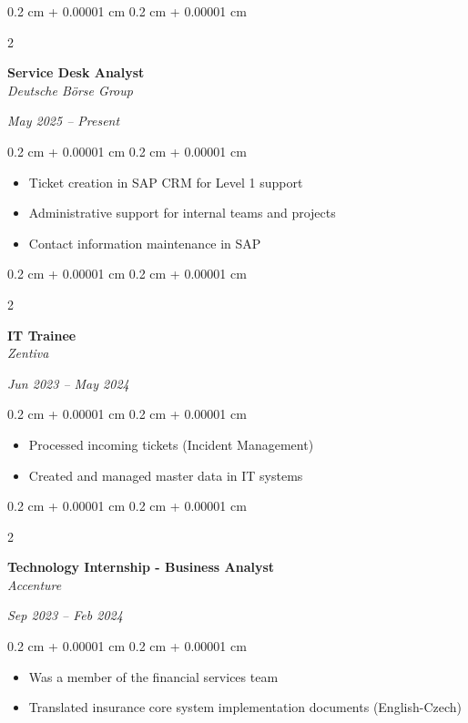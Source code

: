 \documentclass[10pt, letterpaper]{extarticle}
\newenvironment{highlights}{
    \begin{itemize}[
        topsep=0.10 cm,
        parsep=0.10 cm,
        partopsep=0pt,
        itemsep=0pt,
        leftmargin=0.4 cm + 10pt
    ]
}{
    \end{itemize}
} %
\newenvironment{onecolentry}{
    \begin{adjustwidth}{
        0.2 cm + 0.00001 cm
    }{
        0.2 cm + 0.00001 cm
    }
}{
    \end{adjustwidth}
} %
\newenvironment{twocolentry}[2][]{
    \onecolentry
    \def\secondColumn{#2}
    \setcolumnwidth{\fill, 4.5 cm}
    \begin{paracol}{2}
}{
    \switchcolumn \raggedleft \secondColumn
    \end{paracol}
    \endonecolentry
} %
\begin{document}
        \vspace{0.2 cm}
        \begin{twocolentry}{\textit{May 2025 – Present}}
            \textbf{Service Desk Analyst} \\
            \textit{Deutsche Börse Group}
        \end{twocolentry}
        
        \vspace{0.10 cm}
        \begin{onecolentry}
            \begin{highlights}
                \item Ticket creation in SAP CRM for Level 1 support 
                \item Administrative support for internal teams and projects
                \item Contact information maintenance in SAP
            \end{highlights}
        \end{onecolentry}
        
        \vspace{0.2 cm}
        \begin{twocolentry}{\textit{Jun 2023 – May 2024}}
            \textbf{IT Trainee} \\
            \textit{Zentiva}
        \end{twocolentry}
        
        \vspace{0.10 cm}
        \begin{onecolentry}
            \begin{highlights}
                \item Processed incoming tickets (Incident Management)
                \item Created and managed master data in IT systems
            \end{highlights}
        \end{onecolentry}
        
        \vspace{0.2 cm}
        \begin{twocolentry}{\textit{Sep 2023 – Feb 2024}}
            \textbf{Technology Internship - Business Analyst} \\
            \textit{Accenture}
        \end{twocolentry}
        
        \vspace{0.10 cm}
        \begin{onecolentry}
            \begin{highlights}
                \item Was a member of the financial services team
                \item Translated insurance core system implementation documents (English-Czech)
            \end{highlights}
        \end{onecolentry}
\end{document}
